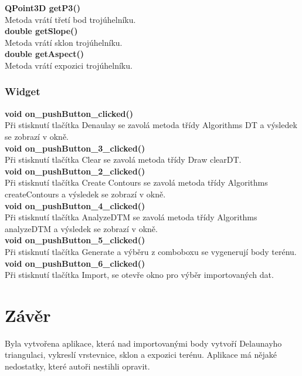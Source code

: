 \documentclass[a4paper, 12pt]{article}
\begin{document}
\textbf{ QPoint3D getP3()}\\
Metoda vrátí třetí bod trojúhelníku.\\

\textbf{double getSlope()}\\
Metoda vrátí sklon trojúhelníku.\\

\textbf{double getAspect()}\\
Metoda vrátí expozici trojúhelníku.\\

\subsubsection{Widget}

\textbf{void on\_pushButton\_clicked()}\\
Při stisknutí tlačítka Denaulay se zavolá metoda třídy Algorithms DT a výsledek se zobrazí v okně.
\\

\textbf{void on\_pushButton\_3\_clicked()}\\
Při stisknutí tlačítka Clear se zavolá metoda třídy Draw clearDT.
\\

\textbf{void on\_pushButton\_2\_clicked()}\\
Při stisknutí tlačítka Create Contours se zavolá metoda třídy Algorithms createContours a výsledek se zobrazí v okně.
\\

\textbf{void on\_pushButton\_4\_clicked()}\\
Při stisknutí tlačítka AnalyzeDTM se zavolá metoda třídy Algorithms analyzeDTM a výsledek se zobrazí v okně.
\\

\textbf{void on\_pushButton\_5\_clicked()}\\
Při stisknutí tlačítka Generate a výběru z comboboxu se vygenerují body terénu.
\\

\textbf{void on\_pushButton\_6\_clicked()}\\
Při stisknutí tlačítka Import, se otevře okno pro výběr importovaných dat.
\\



\clearpage
\section{Závěr}
Byla vytvořena aplikace, která nad importovanými body vytvoří Delaunayho triangulaci, vykreslí vrstevnice, sklon a expozici terénu. Aplikace má nějaké nedostatky, které autoři nestihli opravit.\\
\end{document}
